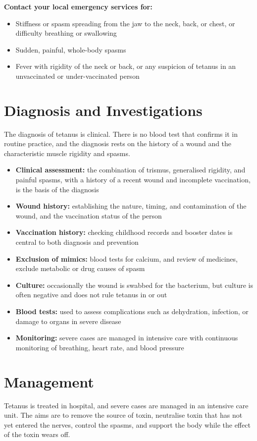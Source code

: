 \textbf{Contact your local emergency services for:}
\begin{itemize}
    \item Stiffness or spasm spreading from the jaw to the neck, back, or chest, or difficulty breathing or swallowing
    \item Sudden, painful, whole-body spasms
    \item Fever with rigidity of the neck or back, or any suspicion of tetanus in an unvaccinated or under-vaccinated person
\end{itemize}

\section*{Diagnosis and Investigations}
The diagnosis of tetanus is clinical. There is no blood test that confirms it in routine practice, and the diagnosis rests on the history of a wound and the characteristic muscle rigidity and spasms.

\begin{itemize}
    \item \textbf{Clinical assessment:} the combination of trismus, generalised rigidity, and painful spasms, with a history of a recent wound and incomplete vaccination, is the basis of the diagnosis
    \item \textbf{Wound history:} establishing the nature, timing, and contamination of the wound, and the vaccination status of the person
    \item \textbf{Vaccination history:} checking childhood records and booster dates is central to both diagnosis and prevention
    \item \textbf{Exclusion of mimics:} blood tests for calcium, and review of medicines, exclude metabolic or drug causes of spasm
    \item \textbf{Culture:} occasionally the wound is swabbed for the bacterium, but culture is often negative and does not rule tetanus in or out
    \item \textbf{Blood tests:} used to assess complications such as dehydration, infection, or damage to organs in severe disease
    \item \textbf{Monitoring:} severe cases are managed in intensive care with continuous monitoring of breathing, heart rate, and blood pressure
\end{itemize}

\section*{Management}
Tetanus is treated in hospital, and severe cases are managed in an intensive care unit. The aims are to remove the source of toxin, neutralise toxin that has not yet entered the nerves, control the spasms, and support the body while the effect of the toxin wears off.

